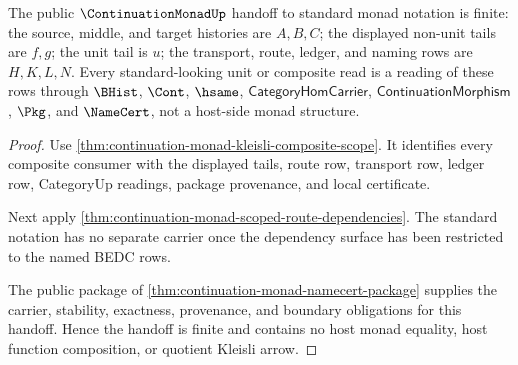 \begin{theorem}
\label{thm:continuation-monad-finite-standard-handoff}
The public $\ContinuationMonadUp$ handoff to standard monad notation is finite: the source, middle, and target histories are $A,B,C$; the displayed non-unit tails are $f,g$; the unit tail is $u$; the transport, route, ledger, and naming rows are $H,K,L,N$. Every standard-looking unit or composite read is a reading of these rows through $\BHist$, $\Cont$, $\hsame$, $\mathsf{CategoryHomCarrier}$, $\mathsf{ContinuationMorphism}$, $\Pkg$, and $\NameCert$, not a host-side monad structure.
\end{theorem}
\begin{proof}
Use \autoref{thm:continuation-monad-kleisli-composite-scope}. It identifies every composite consumer with the displayed tails, route row, transport row, ledger row, CategoryUp readings, package provenance, and local certificate.

Next apply \autoref{thm:continuation-monad-scoped-route-dependencies}. The standard notation has no separate carrier once the dependency surface has been restricted to the named BEDC rows.

The public package of \autoref{thm:continuation-monad-namecert-package} supplies the carrier, stability, exactness, provenance, and boundary obligations for this handoff. Hence the handoff is finite and contains no host monad equality, host function composition, or quotient Kleisli arrow.
\end{proof}

